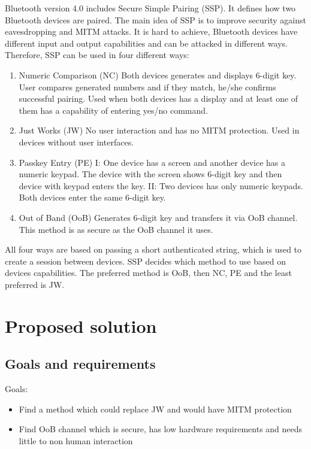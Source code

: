 \documentclass[12pt]{article}
\begin{document}
Bluetooth version 4.0 includes Secure Simple Pairing (SSP). It defines how two Bluetooth devices are paired. The main idea of SSP is to improve security against eavesdropping and MITM attacks. It is hard to achieve, Bluetooth devices have different input and output capabilities and can be attacked in different ways. Therefore, SSP can be used in four different ways:
\begin{enumerate}
	\item Numeric Comparison (NC)
	Both devices generates and displays 6-digit key. User compares generated numbers and if they match, he/she confirms successful pairing. Used when both devices has a display and at least one of them has a capability of entering yes/no command.
	\item Just Works (JW)
	No user interaction and has no MITM protection. Used in devices without user interfaces.

	\item Passkey Entry (PE)
I: One device has a screen and another device has a numeric keypad. The device with the screen shows 6-digit key and then device with keypad enters the key.
	II: Two devices has only numeric keypads. Both devices enter the same 6-digit key.

	\item Out of Band (OoB)
Generates 6-digit key and transfers it via OoB channel. This method is as secure as the OoB channel it uses.
\end{enumerate}
All four ways are based on passing a short authenticated string, which is used to create a session between devices. SSP decides which method to use based on devices capabilities. The preferred method is  OoB, then NC, PE and the least preferred is JW.

\newpage

\section{Proposed solution}
\label{sec:Proposed solution}

\subsection{Goals and requirements}
\label{sub:Goals and requirements}

Goals:
\begin{itemize}
\item Find a method which could replace JW and would have MITM protection
\item Find OoB channel which is secure, has low hardware requirements and needs little to non human interaction
\end{itemize}
\end{document}
